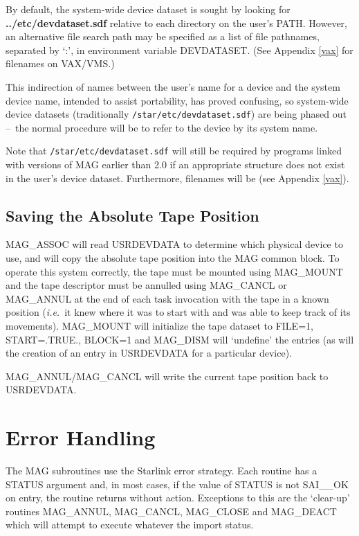 \documentclass[11pt]{starlink}
\providecommand{\dash}{--}
\begin{document}
By default, the system-wide device dataset
is sought by looking for \textbf{../etc/devdataset.sdf} relative to each
directory on the user's PATH. However, an alternative file search path may be
specified as a list of file pathnames, separated by `:', in environment
variable DEVDATASET. (See Appendix \ref{vax} for filenames on VAX/VMS.)

This indirection of names between the user's name for a device and the
system device name, intended to assist portability, has proved confusing,
so system-wide device datasets (traditionally \texttt{/star/etc/devdataset.sdf})
are being phased out \dash\ the normal procedure will be to refer to the device
by its system name.

Note that \texttt{/star/etc/devdataset.sdf} will still be required by programs
linked with versions of MAG earlier than 2.0 if an appropriate structure does
not exist in the user's device dataset. Furthermore, filenames will be
 (see Appendix \ref{vax}).

\subsection{Saving the Absolute Tape Position}
MAG\_ASSOC will read USRDEVDATA to determine which physical device to use, and
will copy the absolute tape position into the MAG common block.
To operate this system correctly, the tape must be mounted using MAG\_MOUNT
and the tape descriptor must be annulled using MAG\_CANCL or MAG\_ANNUL at the
end of each task invocation with the tape in a known position (\emph{i.e.}\ it knew
where it was to start with and was able to keep track of its movements).
MAG\_MOUNT will initialize the tape dataset to FILE=1, START=.TRUE., BLOCK=1
and MAG\_DISM will `undefine' the entries (as will the creation of an entry
in USRDEVDATA for a particular device).

MAG\_ANNUL/MAG\_CANCL will write the current tape position back to USRDEVDATA.

\section{Error Handling}

The MAG subroutines use the Starlink error strategy. Each routine has a STATUS
argument and, in most cases, if the value of STATUS is not SAI\_\_OK on entry,
the routine returns without action. Exceptions to this are the `clear-up'
routines MAG\_ANNUL, MAG\_CANCL, MAG\_CLOSE and MAG\_DEACT which will attempt
to execute whatever the import status.
\end{document}
